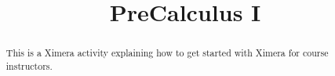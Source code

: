 \documentclass{xourse}
\title{PreCalculus I}
\begin{document}
  
\begin{abstract} %
This is a Ximera activity explaining how to get  
started with Ximera for course instructors.  
\end{abstract}  
\maketitle  
 
\end{document}
